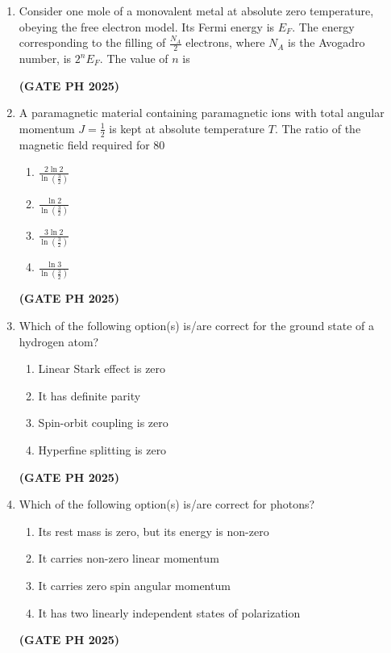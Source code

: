 \documentclass[14pt, a4paper]{extarticle}
\begin{document}
\begin{enumerate}[label=\textbf{Q.\arabic*}]
\item Consider one mole of a monovalent metal at absolute zero temperature, obeying the free electron model. Its Fermi energy is $E_F$. The energy corresponding to the filling of $\frac{N_A}{2}$ electrons, where $N_A$ is the Avogadro number, is $2^nE_F$. The value of $n$ is
\begin{enumerate}
\end{enumerate}
\hfill \textbf{(GATE PH 2025)}

\item A paramagnetic material containing paramagnetic ions with total angular momentum $J = \frac{1}{2}$ is kept at absolute temperature $T$. The ratio of the magnetic field required for 80%
\begin{enumerate}
\item $\frac{2\ln{2}}{\ln\left(\frac{3}{2}\right)}$
\item $\frac{\ln{2}}{\ln\left(\frac{3}{2}\right)}$
\item $\frac{3\ln{2}}{\ln\left(\frac{3}{2}\right)}$
\item $\frac{\ln{3}}{\ln\left(\frac{3}{2}\right)}$
\end{enumerate}
\hfill \textbf{(GATE PH 2025)}

\item Which of the following option(s) is/are correct for the ground state of a hydrogen atom?
\begin{enumerate}
\item Linear Stark effect is zero
\item It has definite parity
\item Spin-orbit coupling is zero
\item Hyperfine splitting is zero
\end{enumerate}
\hfill \textbf{(GATE PH 2025)}

\item Which of the following option(s) is/are correct for photons?
\begin{enumerate}
\item Its rest mass is zero, but its energy is non-zero
\item It carries non-zero linear momentum
\item It carries zero spin angular momentum
\item It has two linearly independent states of polarization
\end{enumerate}
\hfill \textbf{(GATE PH 2025)}


\end{enumerate}
\end{document}
